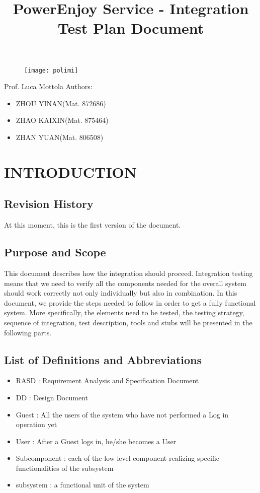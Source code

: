\documentclass{article}
\title{PowerEnjoy Service - Integration Test Plan Document}
\begin{document}
\begin{titlepage}
\begin{figure}
	\centering
	\texttt{[image: polimi]}
\end{figure}
\maketitle
\centering
Prof. Luca Mottola
\newline
\raggedleft
Authors:
\begin{itemize}
	\raggedleft
	\item ZHOU YINAN(Mat. 872686)
	\item ZHAO KAIXIN(Mat. 875464)
	\item ZHAN YUAN(Mat. 806508)	
\end{itemize}
\end{titlepage}

\tableofcontents
\newpage

\section{INTRODUCTION}
 \subsection{Revision History}
 At this moment, this is the first version of the document.
 \subsection{Purpose and Scope}
 This document describes how the integration should proceed. Integration testing means that we need to verify all the components needed for the overall system should work correctly not only individually but also in combination. In this document, we provide the steps needed to follow in order to get a fully functional system. More specifically, the elements need to be tested, the testing strategy, sequence of integration, test description, tools and stubs will be presented in the following parts. 
 \subsection{List of Definitions and Abbreviations}
	 \begin{itemize}
	 	\item RASD : Requirement Analysis and Specification Document
	 	\item DD : Design Document
	 	\item Guest : All the users of the system who have not performed a Log in operation yet
	 	\item User : After a Guest logs in, he/she becomes a User
	 	\item Subcomponent : each of the low level component realizing specific functionalities of the subsystem
	 	\item subsystem : a functional unit of the system
 	 \end{itemize}
\end{document}
